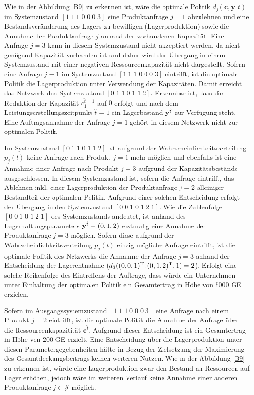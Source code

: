 Wie in der Abbildung \ref{B9} zu erkennen ist, wäre die optimale Politik $d_{j}({\textbf{c},\textbf{y}, t})$ im Systemzustand $[1\;1\;1\;0\;0\;0\;3]$ eine Produktanfrage $j=1$ abzulehnen und eine Bestandsveränderung des Lagers zu bewilligen (Lagerproduktion) sowie die Annahme der Produktanfrage $j$ anhand der vorhandenen Kapazität. Eine Anfrage $j=3$ kann in diesem Systemzustand nicht akzeptiert werden, da nicht genügend Kapazität vorhanden ist und daher wird der Übergang in einem Systemzustand mit einer negativen Ressourcenkapazität nicht dargestellt. Sofern eine Anfrage $j=1$ im Systemzustand $[1\;1\;1\;0\;0\;0\;3]$ eintrifft, ist die optimale Politik die Lagerproduktion unter Verwendung der Kapazitäten. Damit erreicht das Netzwerk den Systemzustand $[0\;1\;1\;0\;1\;1\;2]$. Erkennbar ist, dass die Reduktion der Kapazität $c_1^{\hat t=1}$ auf $0$ erfolgt und nach dem Leistungserstellungszeitpunkt $\hat t = 1$ ein Lagerbestand $\textbf y^{\hat t}$ zur Verfügung steht. Eine Auftragsannahme der Anfrage $j=1$ gehört in diesem Netzwerk nicht zur optimalen Politik.

Im Systemzustand $[0\;1\;1\;0\;1\;1\;2]$ ist aufgrund der Wahrscheinlichkeitsverteilung $p_j(t)$ keine Anfrage nach Produkt $j=1$ mehr möglich und ebenfalls ist eine Annahme einer Anfrage nach Produkt $j=3$ aufgrund der Kapazitätsbestände ausgeschlossen. In diesem Systemzustand ist, sofern die Anfrage eintrifft, das Ablehnen inkl. einer Lagerproduktion der Produktanfrage $j=2$ alleiniger Bestandteil der optimalen Politik. Aufgrund einer solchen Entscheidung erfolgt der Übergang in den Systemzustand $[0\;0\;1\;0\;1\;2\;1]$. Wie die Zahlenfolge $[0\;0\;1\;0\;1\;2\;1]$ des Systemzustands andeutet, ist anhand des Lagerhaltungsparameters $\textbf y^{\hat t}=(0,1,2)$ erstmalig eine Annahme der Produktanfrage $j=3$ möglich. Sofern diese aufgrund der Wahrscheinlichkeitsverteilung $p_j(t)$ einzig mögliche Anfrage eintrifft, ist die optimale Politik des Netzwerks die Annahme der Anfrage $j=3$ anhand der Entscheidung der Lagerentnahme ($d_{3}((0,0,1)^{\textnormal T},(0,1,2)^{\textnormal T}, 1)=2$). Erfolgt eine solche Reihenfolge des Eintreffens der Auftrage, dass würde ein Unternehmen unter Einhaltung der optimalen Politik ein Gesamtertrag in Höhe von $5000$ GE erzielen.

Sofern im Ausgangssystemzustand $[1\;1\;1\;0\;0\;0\;3]$ eine Anfrage nach einem Produkt $j=2$ eintrifft, ist die optimale Politik die Annahme der Anfrage über die Ressourcenkapazitität $\textbf{c}^{\hat t}$. Aufgrund dieser Entscheidung ist ein Gesamtertrag in Höhe von $200$ GE erzielt. Eine Entscheidung über die Lagerproduktion unter diesen Parametergegebenheiten hätte in Bezug der Zielsetzung der Maximierung des Gesamtdeckungsbeitrags keinen weiteren Nutzen. Wie in der Abbildung \ref{B9} zu erkennen ist, würde eine Lagerproduktion zwar den Bestand an Ressourcen auf Lager erhöhen, jedoch wäre im weiteren Verlauf keine Annahme einer anderen Produktanfrage $j\in\mathcal J$ möglich. %

